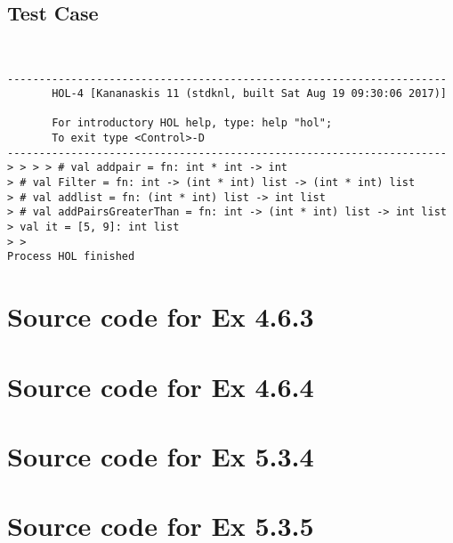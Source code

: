 \documentclass{report}
\begin{document}
\section{Test Case}
\label{test-results-4-6-4}

\begin{session}
  \begin{scriptsize}
\begin{verbatim}


---------------------------------------------------------------------
       HOL-4 [Kananaskis 11 (stdknl, built Sat Aug 19 09:30:06 2017)]

       For introductory HOL help, type: help "hol";
       To exit type <Control>-D
---------------------------------------------------------------------
> > > > # val addpair = fn: int * int -> int
> # val Filter = fn: int -> (int * int) list -> (int * int) list
> # val addlist = fn: (int * int) list -> int list
> # val addPairsGreaterThan = fn: int -> (int * int) list -> int list
> val it = [5, 9]: int list
> > 
Process HOL finished

\end{verbatim}
  \end{scriptsize}
\end{session}


\appendix{}

\chapter{Source code for Ex 4.6.3}
\label{cha:source-code-4-6-3}




\chapter{Source code for Ex 4.6.4}
\label{cha:source-code-4-6-4}




\chapter{Source code for Ex 5.3.4}
\label{cha:source-code-5-3-4}



\chapter{Source code for Ex 5.3.5}
\label{cha:source-code-5-3-5}


\end{document}
